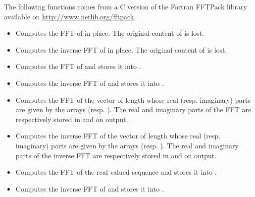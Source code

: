 The following functions comes from a C version of the Fortran FFTPack library
available on \url{http://www.netlib.org/fftpack}.
\begin{itemize}
\item {}
  \sshortdescribe Computes the FFT of  in place. The original content
  of  is lost.

\item {}
  \sshortdescribe Computes the inverse FFT of  in place. The
  original content of  is lost.

\item {}
  \sshortdescribe Computes the FFT of  and stores it into .

\item {}
  \sshortdescribe Computes the inverse FFT of  and stores it into .

\item {}
  \sshortdescribe Computes the FFT of the vector of length  whose real
  (resp. imaginary) parts are given by the arrays 
  (resp. ). The real and imaginary parts of the FFT are respectively
  stored in  and  on output.

\item {}
  \sshortdescribe Computes the inverse FFT of the vector of length 
  whose real (resp. imaginary) parts are given by the arrays 
  (resp. ). The real and imaginary parts of the inverse FFT are
  respectively stored in  and  on output.

\item {}
  \sshortdescribe Computes the FFT of the real valued sequence  and
  stores it into .

\item {}
  \sshortdescribe Computes the inverse FFT of  and stores it into .


\end{itemize}
